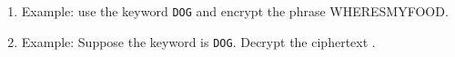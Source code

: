 \documentclass[12pt]{article}
\renewcommand{\emph}[1]{\textsf{\textbf{#1}}}
\newcommand{\be}{\begin{enumerate}}
\newcommand{\ee}{\end{enumerate}}
\begin{document}
\begin{enumerate}
\be
\item Example: use the keyword {\tt DOG} and encrypt the phrase WHERESMYFOOD.

\vfill

\item Example: Suppose the keyword is {\tt DOG}. Decrypt the ciphertext . 



\vfill

\ee

%
%

\end{enumerate}
\end{document}
